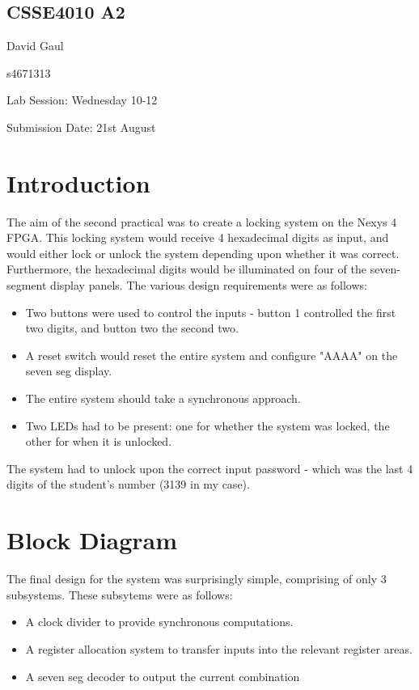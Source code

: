 \documentclass[12pt,a4paper]{article}
\begin{document}
\begin{center}
\bigskip
\section*{CSSE4010 A2}
\end{center}

David Gaul

s4671313

Lab Session: Wednesday 10-12

Submission Date: 21st August

\section{Introduction}

The aim of the second practical was to create a locking system on the Nexys 4 FPGA. This locking system would receive 4 hexadecimal digits as input, and would either lock or unlock the system depending upon whether it was correct. Furthermore, the hexadecimal digits would be illuminated on four of the seven-segment display panels. The various design requirements were as follows:

\begin{itemize}
    \item Two buttons were used to control the inputs - button 1 controlled the first two digits, and button two the second two.
    \item A reset switch would reset the entire system and configure "AAAA" on the seven seg display.
    \item The entire system should take a synchronous approach.
    \item Two LEDs had to be present: one for whether the system was locked, the other for when it is unlocked.
\end{itemize}

The system had to unlock upon the correct input password - which was the last 4 digits of the student's number (3139 in my case).


\section{Block Diagram}

The final design for the system was surprisingly simple, comprising of only 3 subsystems. These subsytems were as follows:

\begin{itemize}
    \item A clock divider to provide synchronous computations.
    \item A register allocation system to transfer inputs into the relevant register areas.
    \item A seven seg decoder to output the current combination
\end{itemize}
\end{document}
